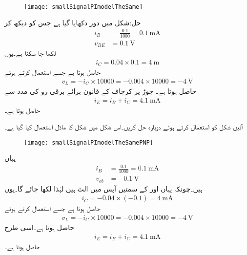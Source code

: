 \begin{figure}
\centering
\texttt{[image: smallSignalPImodelTheSame]}
\caption{}
\label{شکل_باریک_اشاراتی_پائے_ماڈل_یکساں}
\end{figure}
حل:شکل  میں دور دکھایا گیا ہے جس کو دیکھ کر
\begin{align*}
i_B&=\frac{0.1}{1000}=\SI{0.1}{\milli \ampere}\\
v_{BE}&=\SI{0.1}{\volt}
\end{align*}
لکھا جا سکتا ہے۔یوں 
\begin{align*}
i_C=0.04 \times 0.1=\SI{4}{\milli }
\end{align*}
حاصل ہوتا ہے جسے استعمال کرتے ہوئے
\begin{align*}
v_L=-i_C \times 10000=-0.004 \times 10000=\SI{-4}{\volt}
\end{align*}
حاصل ہوتا ہے۔ جوڑ پر کرچاف کے قانون برائے برقی رو کی مدد سے 
\begin{align*}
i_E=i_B+i_C=\SI{4.1}{\milli \ampere}
\end{align*}
حاصل ہوتا ہے۔

آئیں شکل  کو استعمال کرتے ہوئے دوبارہ حل کریں۔اس شکل میں شکل  کا ماڈل استعمال کیا گیا ہے۔
\begin{figure}
\centering
\texttt{[image: smallSignalPImodelTheSamePNP]}
\caption{}
\label{شکل_باریک_اشاراتی_پائے_ماڈل_یکساں_الف}
\end{figure}
یہاں
\begin{align*}
i_B&=\frac{0.1}{1000}=\SI{0.1}{\milli \ampere}\\
v_{eb}&=\SI{-0.1}{\volt}
\end{align*}
ہیں۔چونکہ یہاں  اور  کے سمتیں آپس میں الٹ ہیں لہٰذا  لکھا جائے گا۔یوں
\begin{align*}
i_C=-0.04 \times \left(-0.1 \right)=\SI{4}{\milli \ampere}
\end{align*}
حاصل ہوتا ہے جسے استعمال کرتے ہوئے
\begin{align*}
v_L=-i_C \times 10000=-0.004 \times 10000=\SI{-4}{\volt}
\end{align*}
حاصل ہوتا ہے۔اسی طرح
\begin{align*}
i_E=i_B+i_C=\SI{4.1}{\milli \ampere}
\end{align*}
حاصل ہوتا ہے۔

